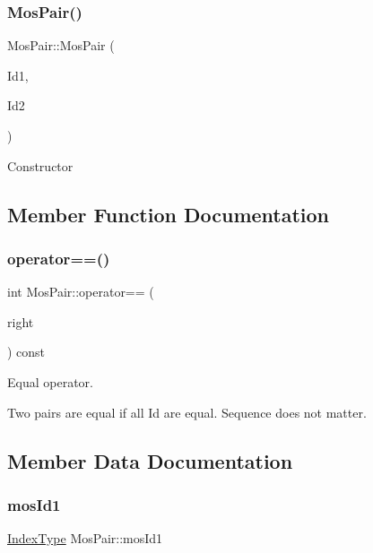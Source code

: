\subsubsection{\texorpdfstring{Mos\+Pair()}{MosPair()}}
{\footnotesize\ttfamily Mos\+Pair\+::\+Mos\+Pair (\begin{DoxyParamCaption}\item[{\hyperlink{type_8h_a581e8093e28e7362f2b6937296190676}{Index\+Type}}]{Id1,  }\item[{\hyperlink{type_8h_a581e8093e28e7362f2b6937296190676}{Index\+Type}}]{Id2 }\end{DoxyParamCaption})\hspace{0.3cm}{\ttfamily [inline]}}

Constructor 

\subsection{Member Function Documentation}
\mbox{\label{structMosPair_aa05c9ae0a9b07420afbb8fc400e45a26}} 
\subsubsection{\texorpdfstring{operator==()}{operator==()}}
{\footnotesize\ttfamily int Mos\+Pair\+::operator== (\begin{DoxyParamCaption}\item[{const \hyperlink{structMosPair}{Mos\+Pair} \&}]{right }\end{DoxyParamCaption}) const\hspace{0.3cm}{\ttfamily [inline]}}

Equal operator.

Two pairs are equal if all Id are equal. Sequence does not matter. 

\subsection{Member Data Documentation}
\mbox{\label{structMosPair_a3a76ccc5aee43e44c96068163f42b5c8}} 
\subsubsection{\texorpdfstring{mos\+Id1}{mosId1}}
{\footnotesize\ttfamily \hyperlink{type_8h_a581e8093e28e7362f2b6937296190676}{Index\+Type} Mos\+Pair\+::mos\+Id1}

